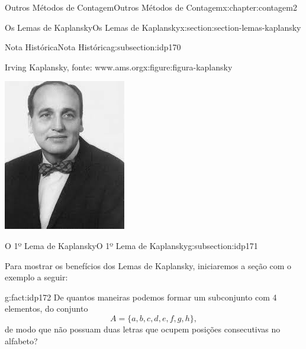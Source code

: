 \documentclass[oneside,10pt,]{book}
\numberwithin{equation}{section}
\begin{document}
\begin{chapterptx}{Outros Métodos de Contagem}{}{Outros Métodos de Contagem}{}{}{x:chapter:contagem2}
\begin{sectionptx}{Os Lemas de Kaplansky}{}{Os Lemas de Kaplansky}{}{}{x:section:section-lemas-kaplansky}
\begin{subsectionptx}{Nota Histórica}{}{Nota Histórica}{}{}{g:subsection:idp170}
\begin{figureptx}{Irving Kaplansky, fonte: www.ams.org}{x:figure:figura-kaplansky}{}
\begin{image}{0.35}{0.3}{0.35}
\includegraphics[width=\linewidth]{images/Kaplansky.jpg}
\end{image}%
\tcblower
\end{figureptx}%
\end{subsectionptx}
%
%
\typeout{************************************************}
\typeout{************************************************}
%
\begin{subsectionptx}{O 1º Lema de Kaplansky}{}{O 1º Lema de Kaplansky}{}{}{g:subsection:idp171}
\begin{introduction}{}%
Para mostrar os benefícios dos Lemas de Kaplansky, iniciaremos a seção com o exemplo a seguir:%
\end{introduction}%
\begin{fact}{}{}{g:fact:idp172}%
De quantos maneiras podemos formar um subconjunto com 4 elementos, do conjunto%
\begin{equation*}
A=\{a,b,c,d,e,f,g,h\},
\end{equation*}
de modo que não possuam duas letras que ocupem posições consecutivas no alfabeto?%

\end{fact}
\end{subsectionptx}
\end{sectionptx}
\end{chapterptx}
\end{document}
